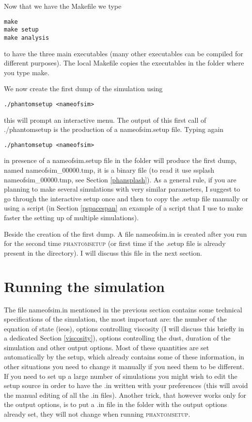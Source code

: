 \documentclass[10pt,a4paper,twoside]{article} %
\begin{document}
Now that we have the Makefile we type
\begin{verbatim}
make
make setup
make analysis
\end{verbatim}
to have the three main executables (many other executables can be compiled for different purposes). The local Makefile copies the executables in the folder where you type make. 

We now create the first dump of the simulation using
\begin{verbatim}
./phantomsetup <nameofsim>
\end{verbatim}
this will prompt an interactive menu. The output of this first call of ./phantomsetup is the production of a nameofsim.setup file. Typing again
\begin{verbatim}
./phantomsetup <nameofsim>
\end{verbatim}
in presence of a nameofsim.setup file in the folder will produce the first dump, named nameofsim\_00000.tmp, it is a binary file (to read it use ssplash nameofsim\_00000.tmp, see Section \ref{phansplash}). As a general rule, if you are planning to make several simulations with very similar parameters, I suggest to go through the interactive setup once and then to copy the .setup file manually or using a script (in Section \ref{pspacespan} an example of a script that I use to make faster the setting up of multiple simulations). 

Beside the creation of the first dump. A file nameofsim.in is created after you run for the second time \textsc{phantomsetup} (or first time if the .setup file is already present in the directory). I will discuss this file in the next section.

\section{Running the simulation}

The file nameofsim.in mentioned in the previous section contains some technical specifications of the simulation, the most important are: the number of the equation of state (ieos), options controlling viscosity (I will discuss this briefly in a dedicated Section \ref{viscosity}), options controlling the dust, duration of the simulation and other output options. Most of these quantities are set automatically by the setup, which already contains some of these information, in other situations you need to change it manually if you need them to be different.
If you need to set up a large number of simulations you might wish to edit the setup source in order to have the .in written with your preferences (this will avoid the manual editing of all the .in files). Another trick, that however works only for the output options, is to put a .in file in the folder with the output options already set, they will not change when running \textsc{phantomsetup}.
\end{document}
